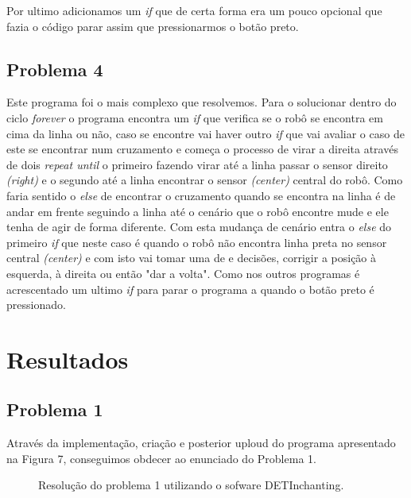 \documentclass[a4paper, 12pt, onecolumn, oneside]{report}
\begin{document}
Por ultimo adicionamos um \emph{if} que de certa forma era um pouco opcional que fazia o código parar assim que pressionarmos o botão preto.


\subsection{Problema 4}

Este programa foi o mais complexo que resolvemos. Para o solucionar dentro do ciclo \textit{forever} o programa encontra um \textit{if} que verifica se o robô se encontra em cima da linha ou não, caso se encontre vai haver outro \textit{if} que vai avaliar o caso de este se encontrar num cruzamento e começa o processo de virar a direita através de dois \textit{repeat until} o primeiro fazendo virar até a linha passar o sensor direito \textit{(right)} e o segundo até a linha encontrar o sensor \textit{(center)} central do robô. Como faria sentido o \textit{else} de encontrar o cruzamento quando se encontra na linha é de andar em frente seguindo a linha até o cenário que o robô encontre mude e ele tenha de agir de forma diferente. Com esta mudança de cenário entra o \textit{else} do primeiro \textit{if} que neste caso é quando o robô não encontra linha preta no sensor central \textit{(center)} e com isto vai tomar uma de e decisões, corrigir a posição à esquerda, à direita ou então "dar a volta". Como nos outros programas é acrescentado um ultimo \textit{if} para parar o programa a quando o botão preto é pressionado.






 \newpage
\section{Resultados}

\subsection{Problema 1}

Através da implementação, criação e posterior uploud do programa apresentado na Figura 7, conseguimos obdecer ao enunciado do Problema 1.

\begin{figure}[H]
\center{\texttt{[image: ex1]}}
\caption{Resolução do problema 1 utilizando o sofware DETInchanting.}
\label{fig:speciation}
\end{figure}
\end{document}
